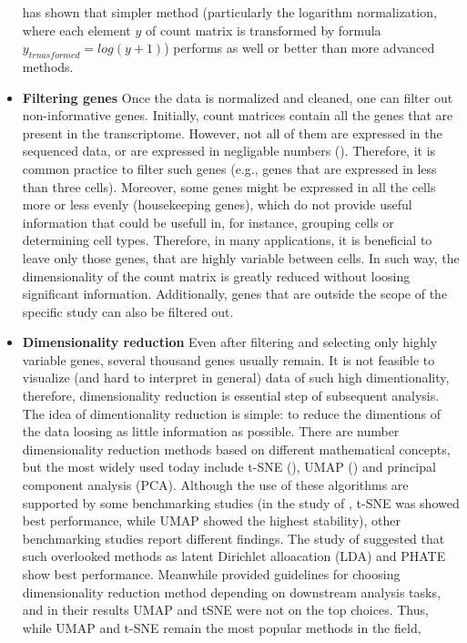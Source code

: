 \begin{itemize}
has shown that simpler method (particularly the logarithm normalization,
where each element $y$ of count matrix is transformed by formula $y_{trnasformed} = log(y+1)$)
performs as well or better than more advanced methods.
\item \textbf{Filtering genes}
Once the data is normalized and cleaned, one can filter out non-informative genes.
Initially, count matrices contain all the genes that are present in the transcriptome.
However, not all of them are expressed in the sequenced data, or are expressed in negligable numbers (\cite{Heumos2023}).
Therefore, it is common practice to filter such genes (e.g., genes that are expressed in less than three cells).
Moreover, some genes might be expressed in all the cells more or less evenly (housekeeping genes),
which do not provide useful information that could be usefull in, for instance, grouping cells or determining cell types.
Therefore, in many applications, it is beneficial to leave only those genes, that are highly variable between cells.
In such way, the dimensionality of the count matrix is greatly reduced without loosing significant information.
Additionally, genes that are outside the scope of the specific study can also be filtered out.
\item \textbf{Dimensionality reduction}
Even after filtering and selecting only highly variable genes, several thousand genes usually remain.
It is not feasible to visualize (and hard to interpret in general) data of such high dimentionality, therefore,
dimensionality reduction is essential step of subsequent analysis.
The idea of dimentionality reduction is simple:
to reduce the dimentions of the data loosing as little information as possible.
There are number dimensionality reduction methods based on different mathematical concepts,
but the most widely used today include
t-SNE (\cite{Hinton2002}), UMAP (\cite{McInnes2018}) and principal component analysis (PCA).
Although the use of these algorithms are supported by some benchmarking studies
(in the study of \textcite{Xiang2021}, t-SNE was showed best performance, while UMAP showed the highest stability),
other benchmarking studies report different findings.
The study of \textcite{Koch2021} suggested that such overlooked methods as
latent Dirichlet alloacation (LDA) and PHATE show best performance.
Meanwhile \textcite{Sun2019} provided guidelines for choosing dimensionality reduction method
depending on downstream analysis tasks, and in their results UMAP and tSNE were not on the top choices.
Thus, while UMAP and t-SNE remain the most popular methods in the field,

\end{itemize}
